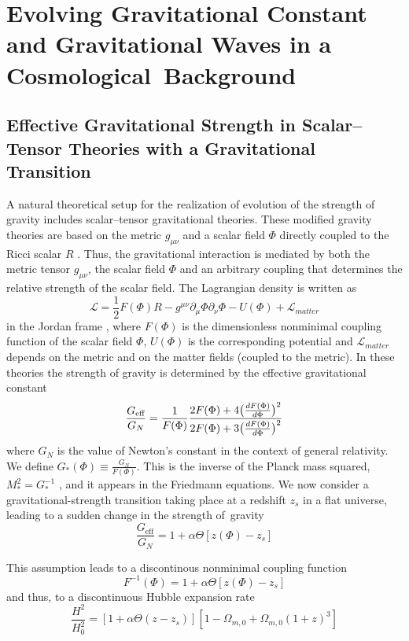 \documentclass[universe,article,accept,moreauthors,pdftex]{Definitions/mdpi}
\newcommand{\be}{\begin{equation}}
\newcommand{\ee}{\end{equation}}
\begin{document}
\section{Evolving Gravitational Constant and Gravitational Waves in a Cosmological~Background}\label{sec:II}


\subsection{Effective Gravitational Strength in Scalar--Tensor Theories with a Gravitational Transition}\label{sec:II.I}
A natural theoretical setup for the realization of evolution of the strength of gravity includes scalar--tensor gravitational theories. These modified gravity theories are based on the metric $g_{\mu\nu}$ and a scalar field $\Phi$ directly coupled to the Ricci scalar $R$ \cite{Abdalla:2022yfr,Will:1984qgz}. Thus, the gravitational interaction is mediated by both the metric tensor $g_{\mu\nu}$, the scalar field $\Phi$ and an arbitrary coupling that determines the relative strength of the scalar field. The Lagrangian density is written as \be \mathcal{L}=\frac{1}{2}F(\Phi)R-g^{\mu\nu}\partial_{\mu}\Phi\partial_{\nu}\Phi-U(\Phi)+\mathcal{L}_{matter}
\ee
in the Jordan frame \cite{Boisseau:2000pr}, where $F(\Phi)$ is the dimensionless nonminimal coupling function of the scalar field $\Phi$, $U(\Phi)$ is the corresponding potential and    $\mathcal{L}_{matter}$ depends on the metric and on the matter fields (coupled to the metric). In these theories the strength of gravity is determined by the effective gravitational constant  
\begin{equation}\label{equation1}
\frac{G_{\text{eff}}}{G_{N}}=\frac{1}{  F(\Phi)}\frac{2F(\Phi)+4\big{(}\frac{d F(\Phi)}{d\Phi}\big{)}^{2}}{2F(\Phi)+3\big{(}\frac{d F(\Phi)}{d\Phi}\big{)}^{2}} 
\end{equation}
where $G_N$ is the value of Newton's constant in the context of general relativity. We define $G_{\ast}(\Phi)\equiv \frac{G_{N}}{F(\Phi)}$. This is the inverse of the Planck mass squared,  $M_{\ast}^2=G_{\ast}^{-1}$ \cite{Boisseau:2000pr}, and it appears in the Friedmann equations. We now consider a gravitational-strength transition taking place at a redshift $z_s$ in a flat universe, leading to a sudden change in the strength of~gravity
\begin{equation}\label{equation2}
    \frac{G_{\text{eff}}}{G_{N}}=1+\alpha \Theta[z(\Phi)-z_{s}]
\end{equation}

This assumption leads to a discontinous nonminimal coupling function
\be
F^{-1}(\Phi)=1+\alpha\Theta[z(\Phi)-z_{s}]
\label{fphitrans}
\ee
and thus, to a discontinuous Hubble expansion rate
\be
\frac{H^{2}}{H_{0}^{2}}=[1+\alpha\Theta(z-z_{s})][1-\Omega_{m,0}+\Omega_{m,0}(1+z)^3]
\label{hztrans}
\ee
\end{document}
